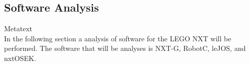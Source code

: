 \newpage
\subsection{Software Analysis}

Metatext\\
In the following section a analysis of software for the LEGO NXT will be performed. The software that will be analyses is NXT-G, RobotC, leJOS, and nxtOSEK.

